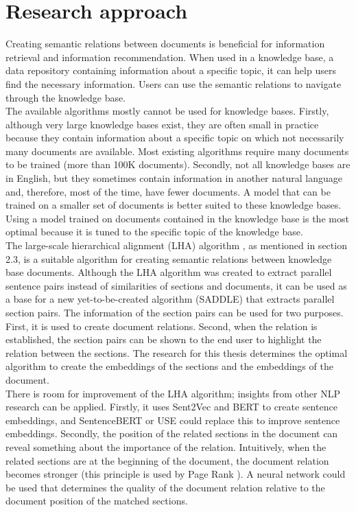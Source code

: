 \pagebreak
\chapter{Research approach}
\label{secResearch}

Creating semantic relations between documents is beneficial for information retrieval and information recommendation. When used in a knowledge base, a data repository containing information about a specific topic, it can help users find the necessary information. Users can use the semantic relations to navigate through the knowledge base.\\

The available algorithms mostly cannot be used for knowledge bases. Firstly, although very large knowledge bases exist, they are often small in practice because they contain information about a specific topic on which not necessarily many documents are available. Most existing algorithms require many documents to be trained (more than 100K documents). Secondly, not all knowledge bases are in English, but they sometimes contain information in another natural language and, therefore, most of the time, have fewer documents. A model that can be trained on a smaller set of documents is better suited to these knowledge bases. Using a model trained on documents contained in the knowledge base is the most optimal because it is tuned to the specific topic of the knowledge base. \\

The large-scale hierarchical alignment (LHA) algorithm \citep{nikolov2018large}, as mentioned in section 2.3, is a suitable algorithm for creating semantic relations between knowledge base documents.
Although the LHA algorithm was created to extract parallel sentence pairs instead of similarities of sections and documents, it can be used as a base for a new yet-to-be-created algorithm (SADDLE) that extracts parallel section pairs. The information of the section pairs can be used for two purposes. First, it is used to create document relations. Second, when the relation is established, the section pairs can be shown to the end user to highlight the relation between the sections. The research for this thesis determines the optimal algorithm to create the embeddings of the sections and the embeddings of the document. \\

There is room for improvement of the LHA algorithm; insights from other NLP research can be applied. Firstly, it uses Sent2Vec and BERT to create sentence embeddings, and SentenceBERT or USE could replace this to improve sentence embeddings. Secondly, the position of the related sections in the document can reveal something about the importance of the relation. Intuitively, when the related sections are at the beginning of the document, the document relation becomes stronger (this principle is used by Page Rank \citep{florescu2017position}). A neural network could be used that determines the quality of the document relation relative to the document position of the matched sections.\\

